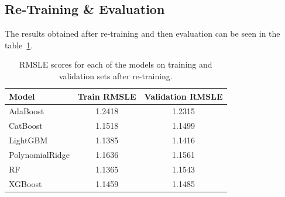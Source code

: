 \documentclass[a4paper,12pt]{article}
\begin{document}
\subsection{Re-Training \& Evaluation}
The results obtained after re-training and then evaluation can be seen in the table~\ref{tab:tab_1}.
\begin{table}[h!]
\centering
\begin{tabular}{|l|c|c|}
\hline
\textbf{Model} & \textbf{Train RMSLE} & \textbf{Validation RMSLE} \\
\hline
AdaBoost         & 1.2418 & 1.2315 \\
CatBoost         & 1.1518 & 1.1499 \\
LightGBM         & 1.1385 & 1.1416 \\
PolynomialRidge  & 1.1636 & 1.1561 \\
RF               & 1.1365 & 1.1543 \\
XGBoost          & 1.1459 & 1.1485 \\
\hline
\end{tabular}
\caption{RMSLE scores for each of the models on training and validation sets after re-training.}
\label{tab:tab_1}
\end{table}
\end{document}
